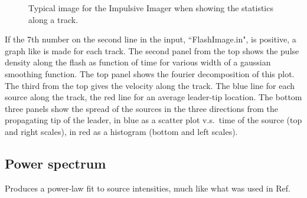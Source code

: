         
\begin{figure}[th]
	\caption{Typical image for the Impulsive Imager when showing the statistics along a track.}	 
\end{figure}

If the 7th number on the second line in the input, ``FlashImage.in", is positive, a graph like  is made for each track. The second panel from the top shows the pulse density along the flash as function of time for various width of a gaussian smoothing function. The top panel shows the fourier decomposition of this plot. The third from the top gives the velocity along the track. The blue line for each source along the track, the red line for an average leader-tip location. The bottom three panels show the spread of the sources in the three directions from the propagating tip of the leader, in blue as a scatter plot v.s.\ time of the source (top and right scales), in red as a histogram (bottom and left scales).

\subsection{Power spectrum}
Produces a power-law fit to source intensities, much like what was used in Ref.~\cite{Machado:2021, Scholten:2021-INL}

